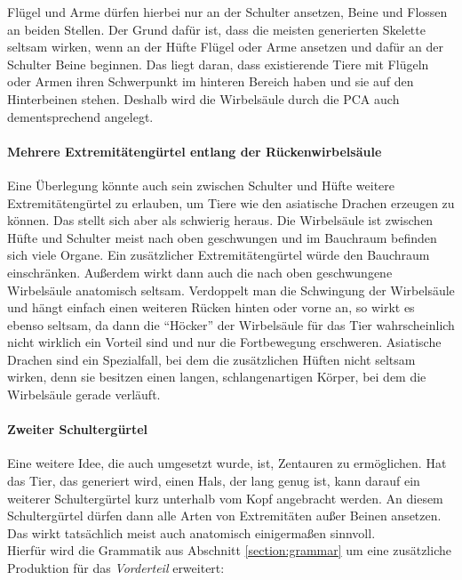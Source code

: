 Flügel und Arme dürfen hierbei nur an der Schulter ansetzen, Beine und Flossen an beiden Stellen. Der Grund dafür ist, dass die meisten generierten Skelette seltsam wirken, wenn an der Hüfte Flügel oder Arme ansetzen und dafür an der Schulter Beine beginnen. Das liegt daran, dass existierende Tiere mit Flügeln oder Armen ihren Schwerpunkt im hinteren Bereich haben und sie auf den Hinterbeinen stehen. Deshalb wird die Wirbelsäule durch die PCA auch dementsprechend angelegt.

\paragraph{Mehrere Extremitätengürtel entlang der Rückenwirbelsäule}
Eine Überlegung könnte auch sein zwischen Schulter und Hüfte weitere Extremitätengürtel zu erlauben, um \zb Tiere wie den asiatische Drachen erzeugen zu können. Das stellt sich aber als schwierig heraus. Die Wirbelsäule ist zwischen Hüfte und Schulter meist nach oben geschwungen und im Bauchraum befinden sich viele Organe. Ein zusätzlicher Extremitätengürtel würde den Bauchraum einschränken. Außerdem wirkt dann auch die nach oben geschwungene Wirbelsäule anatomisch seltsam.
Verdoppelt man die Schwingung der Wirbelsäule und hängt einfach einen weiteren Rücken hinten oder vorne an, so wirkt es ebenso seltsam, da dann die "`Höcker"' der Wirbelsäule für das Tier wahrscheinlich nicht wirklich ein Vorteil sind und nur die Fortbewegung erschweren.
Asiatische Drachen sind ein Spezialfall, bei dem die zusätzlichen Hüften nicht seltsam wirken, denn sie besitzen einen langen, schlangenartigen Körper, bei dem die Wirbelsäule gerade verläuft.

\paragraph{Zweiter Schultergürtel}
Eine weitere Idee, die auch umgesetzt wurde, ist, Zentauren zu ermöglichen. Hat das Tier, das generiert wird, einen Hals, der lang genug ist, kann darauf ein weiterer Schultergürtel kurz unterhalb vom Kopf angebracht werden. An diesem Schultergürtel dürfen dann alle Arten von Extremitäten außer Beinen ansetzen. Das wirkt tatsächlich meist auch anatomisch einigermaßen sinnvoll.\\
Hierfür wird die Grammatik aus Abschnitt \ref{section:grammar} um eine zusätzliche Produktion für das \emph{Vorderteil} erweitert:

